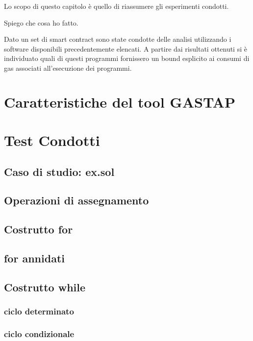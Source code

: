 
Lo scopo di questo capitolo è quello di riassumere gli esperimenti condotti.\newline

Spiego che cosa ho fatto.

Dato un set di smart contract sono state condotte delle analisi utilizzando i software disponibili precedentemente elencati. A partire dai risultati ottenuti si è individuato quali di questi programmi fornissero un bound esplicito ai consumi di gas associati all'esecuzione dei programmi.\newline

\section{Caratteristiche del tool GASTAP}

\section{Test Condotti}

    \subsection{Caso di studio: ex.sol}

    \subsection{Operazioni di assegnamento}

    \subsection{Costrutto for}
    
    \subsection{for annidati}

    \subsection{Costrutto while}
    
        \subsubsection{ciclo determinato}

        \subsubsection{ciclo condizionale}

